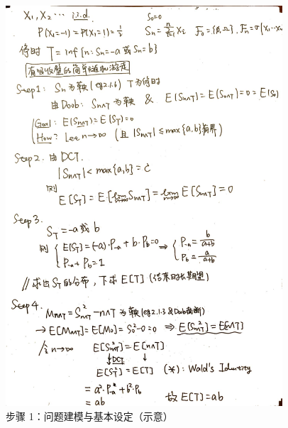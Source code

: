 \documentclass[12pt, a4paper, oneside, fontset=windows]{ctexbook}
\begin{document}
\begin{figure}[h]
	\centering
	\includegraphics[width=0.92\textwidth]{1.jpg}
	\caption{步骤 1：问题建模与基本设定（示意）}\label{fig:rw-step1}
\end{figure}
\end{document}
